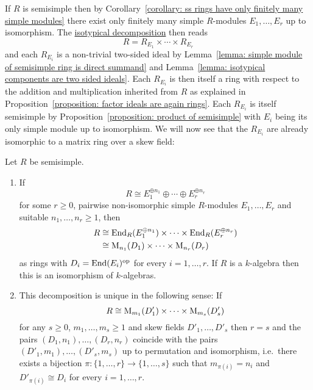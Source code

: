 \begin{fluff}
  \label{fluff: intro to artin wedderburn}
  If $R$ is semisimple then by Corollary~\ref{corollary: ss rings have only finitely many simple modules} there exist only finitely many simple $R$-modules $E_1, \dotsc, E_r$ up to isomorphism.
  The \hyperref[theorem: isotypical decomposition]{isotypical decomposition} then reads
  \[
      R
    = R_{E_1} \times \dotsb \times R_{E_r}
  \]
  and each $R_{E_i}$ is a non-trivial two-sided ideal by Lemma~\ref{lemma: simple module of semisimple ring is direct summand} and Lemma~\ref{lemma: isotypical components are two sided ideals}.
  Each $R_{E_i}$ is then itself a ring with respect to the addition and multiplication inherited from $R$ as explained in Proposition~\ref{proposition: factor ideals are again rings}.
  Each $R_{E_i}$ is itself semisimple by Proposition~\ref{proposition: product of semisimple} with $E_i$ being its only simple module up to isomorphism.
  We will now see that the $R_{E_i}$ are already isomorphic to a matrix ring over a skew field:
\end{fluff}


\begin{theorem}
  \label{theorem: artin wedderburn theorem}
  Let $R$ be semisimple.
  \begin{enumerate}
    \item
      If
      \[
              R
        \cong E_1^{\oplus n_1} \oplus \dotsb \oplus E_r^{\oplus n_r}
      \]
      for some $r \geq 0$, pairwise non-isomorphic simple $R$-modules $E_1, \dotsc, E_r$ and suitable $n_1, \dotsc, n_r \geq 1$, then
      \begin{align*}
                R
        &\cong  \operatorname{End}_R(E_1^{\oplus n_1}) \times \dotsb \times \operatorname{End}_R(E_r^{\oplus n_r})  \\
        &\cong  \operatorname{M}_{n_1}(D_1) \times \dotsb \times  \operatorname{M}_{n_r}(D_r)
      \end{align*}
      as rings with $D_i = \operatorname{End}(E_i)^{\mathrm{op}}$ for every $i = 1, \dotsc, r$.
      If $R$ is a $k$-algebra then this is an isomorphism of $k$-algebras.
    \item
      This decomposition is unique in the following sense:
      If
      \[
              R
        \cong \operatorname{M}_{m_1}(D'_1) \times \dotsb \times \operatorname{M}_{m_s}(D'_s)
      \]
      for any $s \geq 0$, $m_1, \dotsc, m_s \geq 1$ and skew fields $D'_1, \dotsc, D'_s$ then $r = s$ and the pairs $(D_1, n_1), \dotsc, (D_r, n_r)$ coincide with the pairs $(D'_1, m_1), \dotsc, (D'_s, m_s)$ up to permutation and isomorphism, i.e.\ there exists a bijection $\pi \colon \{1, \dotsc, r\} \to \{1, \dotsc, s\}$ such that $m_{\pi(i)} = n_i$ and $D'_{\pi(i)} \cong D_i$ for every $i = 1, \dotsc, r$.
  \end{enumerate}
\end{theorem}



